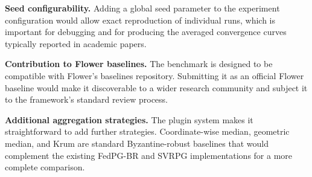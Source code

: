 \textbf{Seed configurability.} Adding a global seed parameter to the experiment
configuration would allow exact reproduction of individual runs, which is
important for debugging and for producing the averaged convergence curves
typically reported in academic papers.

\textbf{Contribution to Flower baselines.} The benchmark is designed to be
compatible with Flower's baselines repository. Submitting it as an official
Flower baseline would make it discoverable to a wider research community and
subject it to the framework's standard review process.

\textbf{Additional aggregation strategies.} The plugin system makes it
straightforward to add further strategies. Coordinate-wise median, geometric
median, and Krum are standard Byzantine-robust baselines that would complement
the existing FedPG-BR and SVRPG implementations for a more complete comparison.
